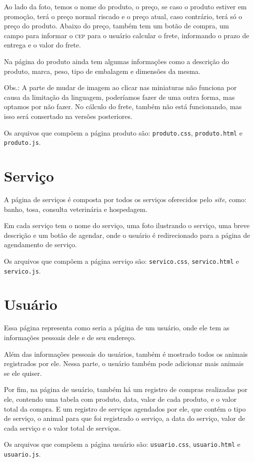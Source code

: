 Ao lado da foto, temos o nome do produto, o preço, se caso o produto estiver em promoção, terá
o preço normal riscado e o preço atual, caso contrário, terá só o preço do produto. Abaixo do
preço, também tem um botão de compra, um campo para informar o \textsc{cep} para o usuário
calcular o frete, informando o prazo de entrega e o valor do frete.

Na página do produto ainda tem algumas informações como a descrição do produto, marca, peso,
tipo de embalagem e dimensões da mesma.

Obs.: A parte de mudar de imagem ao clicar nas miniaturas não funciona por causa da limitação da
linguagem, poderíamos fazer de uma outra forma, mas optamos por não fazer. No cálculo do frete,
também não está funcionando, mas isso será consertado na versões posteriores.

Os arquivos que compõem a página produto são: \texttt{produto.css}, \texttt{produto.html} e
\texttt{produto.js}.

\section{Serviço}
A página de serviços é composta por todos os serviços oferecidos pelo \emph{site}, como: banho, tosa,
consulta veterinária e hospedagem.

Em cada serviço tem o nome do serviço, uma foto ilustrando o serviço, uma breve descrição e um
botão de agendar, onde o usuário é redirecionado para a página de agendamento de serviço.

Os arquivos que compõem a página serviço são: \texttt{servico.css}, \texttt{servico.html} e
\texttt{servico.js}.

\section{Usuário}
Essa página representa como seria a página de um usuário, onde ele tem as informações pessoais
dele e de seu endereço.

Além das informações pessoais do usuários, também é mostrado todos os animais registrados por
ele. Nessa parte, o usuário também pode adicionar mais animais se ele quiser.

Por fim, na página de usuário, também há um registro de compras realizadas por ele, contendo
uma tabela com produto, data, valor de cada produto, e o valor total da compra. E um registro
de serviços agendados por ele, que contém o tipo de serviço, o animal para que foi registrado
o serviço, a data do serviço, valor de cada serviço e o valor total de serviços.

Os arquivos que compõem a página usuário são: \texttt{usuario.css}, \texttt{usuario.html} e
\texttt{usuario.js}.
